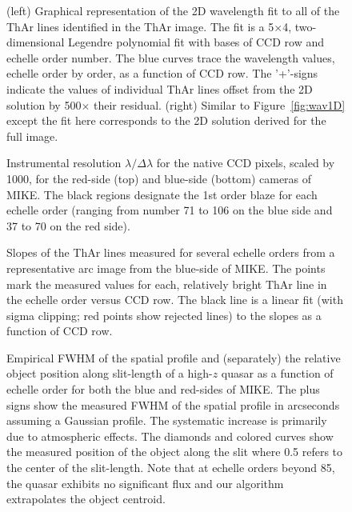 \documentclass[12pt,preprint]{aastex}
\begin{document}
\begin{figure}
\caption{(left) Graphical representation of the 2D wavelength
fit to all of the ThAr lines identified in the ThAr image.
The fit is a 5$\times$4, two-dimensional Legendre polynomial
fit with bases of CCD row and echelle order number.
The blue curves trace the wavelength values, echelle order by
order, as a function of CCD row.  The '+'-signs indicate
the values of individual ThAr lines offset from the 2D solution
by 500$\times$ their residual.
(right)  Similar to Figure~\ref{fig:wav1D} except the fit here
corresponds to the 2D solution derived for the full image.
}
\label{fig:wav2D}
\end{figure}

\begin{figure}
\caption{Instrumental resolution $\lambda / \Delta \lambda$ for
the native CCD pixels, scaled by 1000, for the red-side (top) and 
blue-side (bottom) cameras of MIKE.  The black regions designate
the 1st order blaze for each echelle order (ranging from number 
71 to 106 on the blue side and 37 to 70 on the red side). }
\label{fig:wavdisp}
\end{figure}


\begin{figure}
\caption{Slopes of the ThAr lines measured for several echelle
orders from a representative arc image from the blue-side of MIKE.
The points mark the measured values for each, relatively bright ThAr 
line in the echelle order versus CCD row.  The black line
is a linear fit (with sigma clipping; red points show rejected lines)
to the slopes as a function of CCD row.
}
\label{fig:tilt}
\end{figure}

\begin{figure}
\caption{Empirical FWHM of the spatial profile and (separately)
the relative object position along slit-length of a high-$z$ quasar
as a function of echelle order for both the blue and red-sides of MIKE. 
The plus signs show the measured FWHM of the spatial profile in arcseconds
assuming a Gaussian profile.  The systematic increase is primarily
due to atmospheric effects.  The diamonds and colored curves
show the measured position of the object along the slit where 0.5
refers to the center of the slit-length.  Note that at echelle orders
beyond 85, the quasar exhibits no significant flux and our algorithm
extrapolates the object centroid. 
}
\label{fig:fwhm}
\end{figure}
\end{document}
